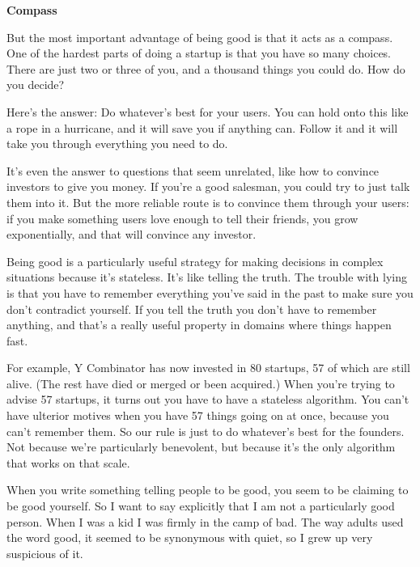 \textbf{Compass}

But the most important advantage of being good is
                  that it acts as a compass. One of the hardest parts of doing a
                  startup is that you have so many choices. There are just two
                  or three of you, and a thousand things you could do. How do
                  you decide?

Here's the answer: Do whatever's best
                  for your users. You can hold onto this like a rope in a
                  hurricane, and it will save you if anything can. Follow it and
                  it will take you through everything you need to do.

It's
                  even the answer to questions that seem unrelated, like how to
                  convince investors to give you money. If you're a good
                  salesman, you could try to just talk them into it. But the
                  more reliable route is to convince them through your users: if
                  you make something users love enough to tell their friends,
                  you grow exponentially, and that will convince any
                  investor.

Being good is a particularly useful
                  strategy for making decisions in complex situations because
                  it's stateless. It's like telling the truth. The trouble with
                  lying is that you have to remember everything you've said in
                  the past to make sure you don't contradict yourself. If you
                  tell the truth you don't have to remember anything, and that's
                  a really useful property in domains where things happen
                  fast.

For example, Y Combinator has now invested in
                  80 startups, 57 of which are still alive. (The rest have died
                  or merged or been acquired.) When you're trying to advise 57
                  startups, it turns out you have to have a stateless algorithm.
                  You can't have ulterior motives when you have 57 things going
                  on at once, because you can't remember them. So our rule is
                  just to do whatever's best for the founders. Not because we're
                  particularly benevolent, but because it's the only algorithm
                  that works on that scale.

When you write something
                  telling people to be good, you seem to be claiming to be good
                  yourself. So I want to say explicitly that I am not a
                  particularly good person. When I was a kid I was firmly in the
                  camp of bad. The way adults used the word good, it seemed to
                  be synonymous with quiet, so I grew up very suspicious of
                  it.

